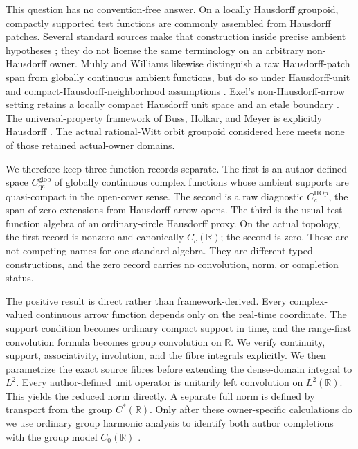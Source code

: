 \documentclass[11pt]{article}
\theoremstyle{definition}
\newcommand{\R}{\mathbb R}
\newcommand{\Cglob}{C_{\mathrm{qc}}^{\mathrm{glob}}}
\newcommand{\CHOp}{C_c^{\mathrm{HOp}}}
\begin{document}
This question has no convention-free answer.  On a locally Hausdorff
groupoid, compactly supported test functions are commonly assembled from
Hausdorff patches.  Several standard sources make that construction inside
precise ambient hypotheses \cite[physical pp.~3, 17, and 19; printed
pp.~567, 581, and 583]{Tu2004}; they do not license the same terminology on
an arbitrary non-Hausdorff owner.  Muhly and Williams likewise distinguish a
raw Hausdorff-patch span from globally continuous ambient functions, but do
so under Hausdorff-unit and compact-Hausdorff-neighborhood assumptions
\cite[pp.~3--7 and Proposition~4.4, pp.~21--23]{MuhlyWilliams2008}.
Exel's non-Hausdorff-arrow setting retains a locally compact Hausdorff unit
space and an etale boundary
\cite[arXiv v3, physical/printed p.~1, Section~1]{Exel2011}.  The universal-property
framework of Buss, Holkar, and Meyer is explicitly Hausdorff
\cite[arXiv v2, physical pp.~1--2]{BussHolkarMeyer2018}.  The actual rational-Witt orbit
groupoid considered here meets none of those retained actual-owner domains.

We therefore keep three function records separate.  The first is an
author-defined space $\Cglob$ of globally continuous complex functions whose
ambient supports are quasi-compact in the open-cover sense.  The second is a
raw diagnostic $\CHOp$, the span of zero-extensions from Hausdorff arrow
opens.  The third is the usual test-function algebra of an ordinary-circle
Hausdorff proxy.  On the actual topology, the first record is nonzero and
canonically $C_c(\R)$; the second is zero.  These are not competing names for
one standard algebra.  They are different typed constructions, and the zero
record carries no convolution, norm, or completion status.

The positive result is direct rather than framework-derived.  Every complex-
valued continuous arrow function depends only on the real-time coordinate.
The support condition becomes ordinary compact support in time, and the
range-first convolution formula becomes group convolution on $\R$.  We
verify continuity, support, associativity, involution, and the fibre
integrals explicitly.  We then parametrize the exact source fibres before
extending the dense-domain integral to $L^2$.  Every author-defined unit
operator is unitarily left convolution on $L^2(\R)$.  This yields the reduced
norm directly.  A separate full norm is defined by transport from the group
$C^*(\R)$.  Only after these owner-specific calculations do we use ordinary
group harmonic analysis to identify both author completions with the group
model $C_0(\R)$ \cite[author manuscript v3.1, physical/printed p.~38/26,
Example~1.80; p.~94/82, Proposition~3.1; pp.~210--211/198--199,
Examples~7.9 and 7.11 and Theorem~7.13]{Williams2007}.
\end{document}
